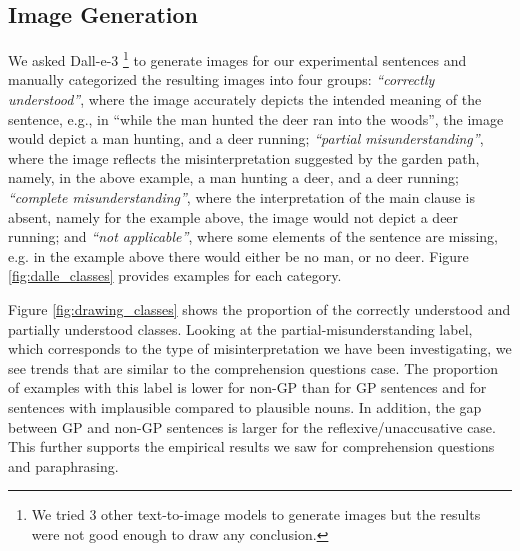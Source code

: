\subsection{Image Generation}

We asked Dall-e-3 \cite{dalle_3}\footnote{We tried 3 other text-to-image models to generate images but the results were not good enough to draw any conclusion.} to generate images for our experimental sentences and manually categorized the resulting images into four groups: \emph{``correctly understood''}, where the image accurately depicts the intended meaning of the sentence, e.g., in ``while the man hunted the deer ran into the woods'', the image would depict a man hunting, and a deer running; \emph{``partial misunderstanding''}, where the image reflects the misinterpretation suggested by the garden path, namely, in the above example, a man hunting a deer, and a deer running; \emph{``complete misunderstanding''}, where the interpretation of the main clause is absent, namely for the example above, the image would not depict a deer running; and \emph{``not applicable''}, where some elements of the sentence are missing, e.g. in the example above there would either be no man, or no deer. Figure \ref{fig:dalle_classes} provides examples for each category. 

Figure \ref{fig:drawing_classes} shows the proportion of the correctly understood and partially understood classes. 
Looking at the partial-misunderstanding label, which corresponds to the type of misinterpretation we have been investigating, we see trends that are similar to the  comprehension questions case. The proportion of examples with this label is lower for non-GP than for GP sentences and for sentences with implausible compared to plausible nouns. In addition, the gap between GP and non-GP sentences is larger for the reflexive/unaccusative case. This further supports the empirical results we saw for comprehension questions and paraphrasing.

